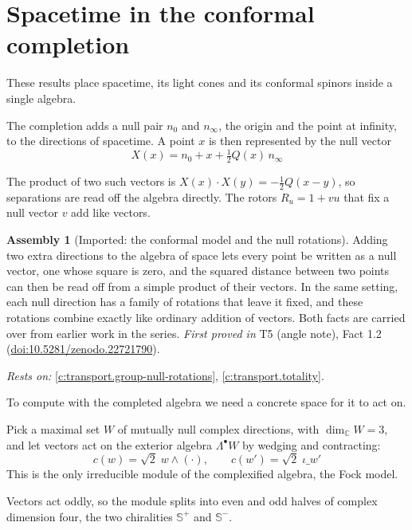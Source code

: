 \documentclass[11pt]{article}
\theoremstyle{definition}
\newtheorem{assembled}[theorem]{Assembly}
\theoremstyle{plain}
\providecommand{\C}{}\renewcommand{\C}{\mathbb{C}}
\providecommand{\CS}{}\renewcommand{\CS}{{\mathbb{S}^{+}}}
\providecommand{\CSm}{}\renewcommand{\CSm}{{\mathbb{S}^{-}}}
\providecommand{\nInf}{}\renewcommand{\nInf}{n_\infty}
\providecommand{\nO}{}\renewcommand{\nO}{n_0}
\begin{document}
\section{Spacetime in the conformal completion}

These results place spacetime, its light cones and its conformal spinors inside a single algebra.

The completion adds a null pair $\nO$ and $\nInf$, the origin and the point at infinity, to the directions of spacetime. A point $x$ is then represented by the null vector \[ X(x) = \nO + x + \tfrac12 Q(x)\,\nInf \]

The product of two such vectors is $X(x)\cdot X(y) = -\tfrac12 Q(x - y)$, so separations are read off the algebra directly. The rotors $R_u = 1 + vu$ that fix a null vector $v$ add like vectors.

\begin{assembled}[Imported: the conformal model and the null rotations]\label{c:angle.imported-conformal-model-null-rotations}
Adding two extra directions to the algebra of space lets every point be written as a null vector, one whose square is zero, and the squared distance between two points can then be read off from a simple product of their vectors. In the same setting, each null direction has a family of rotations that leave it fixed, and these rotations combine exactly like ordinary addition of vectors. Both facts are carried over from earlier work in the series.
\emph{First proved in} T5 (angle note), Fact 1.2 (\href{https://doi.org/10.5281/zenodo.22721790}{doi:10.5281/zenodo.22721790}).
\end{assembled}
\noindent\emph{Rests on:} \ref{c:transport.group-null-rotations}, \ref{c:transport.totality}.

To compute with the completed algebra we need a concrete space for it to act on.

Pick a maximal set $W$ of mutually null complex directions, with $\dim_\C W = 3$, and let vectors act on the exterior algebra $\Lambda^\bullet W$ by wedging and contracting: \[ c(w) = \sqrt2\; w \wedge (\cdot), \qquad c(w') = \sqrt2\; \iota\_{w'} \] This is the only irreducible module of the complexified algebra, the Fock model.

Vectors act oddly, so the module splits into even and odd halves of complex dimension four, the two chiralities $\CS$ and $\CSm$.
\end{document}
